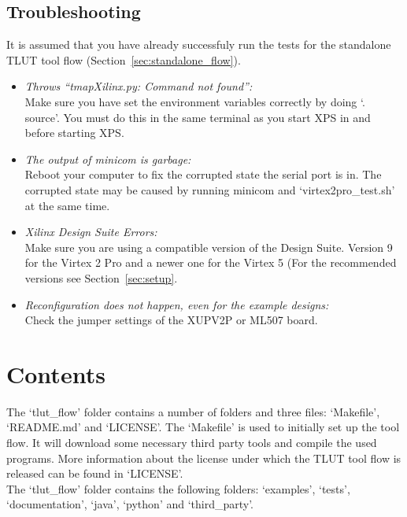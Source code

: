 \documentclass[a4paper,oneside]{memoir}
\begin{document}
\section{Troubleshooting}\label{sec:xilinx_troubleshooting}
It is assumed that you have already successfuly run the tests for the standalone TLUT tool flow (Section~\ref{sec:standalone_flow}).

\begin{itemize}
\item \emph{Throws ``tmapXilinx.py: Command not found'':}\\
Make sure you have set the environment variables correctly by doing `. source'. You must do this in the same terminal as you start XPS in and before starting XPS.
\item \emph{The output of minicom is garbage:}\\
Reboot your computer to fix the corrupted state the serial port is in. The corrupted state may be caused by running minicom and `virtex2pro\_test.sh' at the same time.
\item \emph{Xilinx Design Suite Errors:}\\
Make sure you are using a compatible version of the Design Suite. Version 9 for the Virtex 2 Pro and a newer one for the Virtex 5 (For the recommended versions see Section~\ref{sec:setup}.
\item \emph{Reconfiguration does not happen, even for the example designs:}\\
Check the jumper settings of the XUPV2P or ML507 board.
\end{itemize}



\clearpage
\chapter{Contents}\label{sec:contents}
The `tlut\_flow' folder contains a number of folders and three files: `Makefile', `README.md' and `LICENSE'. 
The `Makefile' is used to initially set up the tool flow. It will download  some necessary third party tools and compile the used programs.
More information about the license under which the TLUT tool flow is released can be found in `LICENSE'.\\

The `tlut\_flow' folder contains the following folders:  `examples', `tests', `documentation',  `java', `python' and `third\_party'.
\end{document}
